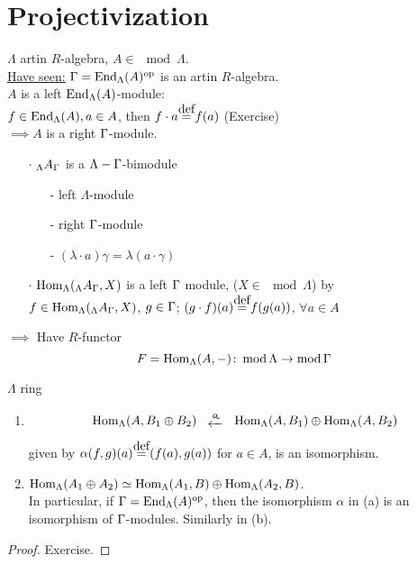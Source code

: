 
\section{Projectivization}
$\Lambda$ artin $R$-algebra, $A \in \mod \Lambda$.\\
\underline{Have seen:} $\Gamma = \operatorname{End}_\Lambda(A)^{{\operatorname{op}\nolimits}}$ is an artin $R$-algebra.\\
$A$ is a left $\operatorname{End}_\Lambda(A)$-module:\\
$f \in \operatorname{End}_\Lambda(A), a \in A$, then $f\cdot a \stackrel{\mathclap{\normalfont\mbox{def}}}{=} f(a)$ (Exercise)\\
$\implies A$ is a right $\Gamma$-module.

\begin{exer}
\begin{enumerate}
\item[]
\item[$\cdot$] $_\Lambda A_\Gamma$ is a $\Lambda-\Gamma$-bimodule
\begin{enumerate}
\item[-] left $\Lambda$-module
\item[-] right $\Gamma$-module
\item[-] $(\lambda \cdot a)\gamma = \lambda(a \cdot \gamma)$
\end{enumerate}

\item[$\cdot$] $\operatorname{Hom}_\Lambda(_\Lambda A_\Gamma, X)$ is a left $\Gamma$ module, ($X \in \mod \Lambda$) by\\
$f \in \operatorname{Hom}_\Lambda(_\Lambda A_\Gamma, X)$, $g \in \Gamma$; $(g\cdot f)(a) \stackrel{\mathclap{\normalfont\mbox{def}}}{=} f(g(a))$, $\forall a \in A$
\end{enumerate}
$\implies$ Have $R$-functor \[ F = \operatorname{Hom}_\Lambda(A, -)\colon \operatorname{mod}\nolimits\Lambda \to \operatorname{mod}\nolimits\Gamma \]
\end{exer}

\begin{lem}
\label{lem:47}
$\Lambda$ ring
\begin{enumerate}[\rm(a)]
\item \[\xymatrix{\Hom_\Lambda(A, B_1 \oplus B_2)
      \ar@{}[r]^-\alpha|-*[@]{\xleftarrow{\sim}}  & \Hom_\Lambda(A,
      B_1) \oplus \Hom_\Lambda(A,B_2)}\] 
given by $\alpha(f, g)(a)
\stackrel{\mathclap{\normalfont\mbox{def}}}{=} (f(a), g(a)) $ for $a
\in A$, is an isomorphism. 
\item $\operatorname{Hom}_\Lambda(A_1 \oplus A_2) \simeq \operatorname{Hom}_\Lambda(A_1, B) \oplus \operatorname{Hom}_\Lambda(A_2, B)$.\\
In particular, if $\Gamma = \operatorname{End}_\Lambda(A)^{{\operatorname{op}\nolimits}}$, then the isomorphism
$\alpha$ in \textup{(a)} is an isomorphism of $\Gamma$-modules. Similarly
in \textup{(b)}.  
\end{enumerate}
\begin{proof}
Exercise.
\end{proof}
\end{lem}

